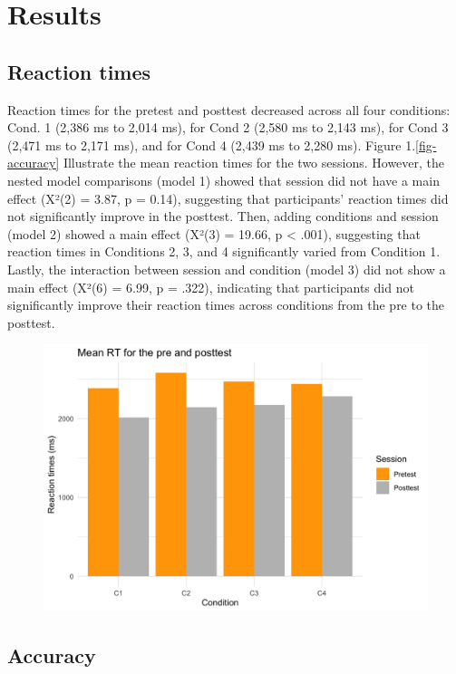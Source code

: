 \documentclass[
  man,floatsintext]{apa6}
\begin{document}
\section{Results}\label{results}

\subsection{Reaction times}\label{reaction-times-1}

Reaction times for the pretest and posttest decreased across all four conditions: Cond. 1 (2,386 ms to 2,014 ms), for Cond 2 (2,580 ms to 2,143 ms), for Cond 3 (2,471 ms to 2,171 ms), and for Cond 4 (2,439 ms to 2,280 ms). Figure 1.\ref{fig-accuracy} Illustrate the mean reaction times for the two sessions. However, the nested model comparisons (model 1) showed that session did not have a main effect (X²(2) = 3.87, p = 0.14), suggesting that participants' reaction times did not significantly improve in the posttest. Then, adding conditions and session (model 2) showed a main effect (X²(3) = 19.66, p \textless{} .001), suggesting that reaction times in Conditions 2, 3, and 4 significantly varied from Condition 1. Lastly, the interaction between session and condition (model 3) did not show a main effect (X²(6) = 6.99, p = .322), indicating that participants did not significantly improve their reaction times across conditions from the pre to the posttest.

\begin{figure}
\includegraphics[width=4.72in]{../Plots/RT_plot} \caption{ }\label{fig:unnamed-chunk-1}
\end{figure}

\subsection{Accuracy}\label{accuracy-1}
\end{document}
